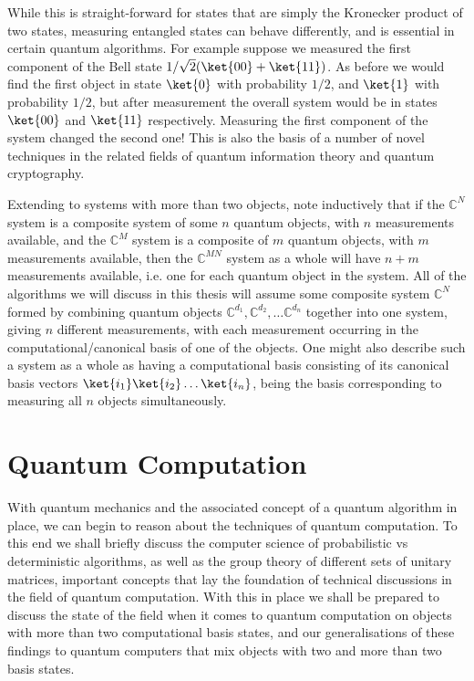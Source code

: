 While this is straight-forward for states that are simply the Kronecker product of two states, measuring entangled states can behave differently, and is essential in certain quantum algorithms. For example suppose we measured the first component of the Bell state $1/\sqrt{2}(\ket{00}+\ket{11})$. As before we would find the first object in state $\ket{0}$ with probability $1/2$, and $\ket{1}$ with probability $1/2$, but after measurement the overall system would be in states $\ket{00}$ and $\ket{11}$ respectively. Measuring the first component of the system changed the second one! This is also the basis of a number of novel techniques in the related fields of quantum information theory and quantum cryptography.

Extending to systems with more than two objects, note inductively that if the $\mathbb{C}^N$ system is a composite system of some $n$ quantum objects, with $n$ measurements available, and the $\mathbb{C}^M$ system is a composite of $m$ quantum objects, with $m$ measurements available, then the $\mathbb{C}^{MN}$ system as a whole will have $n+m$ measurements available, i.e. one for each quantum object in the system. All of the algorithms we will discuss in this thesis will assume some composite system $\mathbb{C}^N$ formed by combining quantum objects $\mathbb{C}^{d_1}, \mathbb{C}^{d_2}, \dots \mathbb{C}^{d_n}$ together into one system, giving $n$ different measurements, with each measurement occurring in the computational/canonical basis of one of the objects. One might also describe such a system as a whole as having a computational basis consisting of its canonical basis vectors $\ket{i_1}\ket{i_2}\dots\ket{i_n}$, being the basis corresponding to measuring all $n$ objects simultaneously.


\section{Quantum Computation}

With quantum mechanics and the associated concept of a quantum algorithm in place, we can begin to reason about the techniques of quantum computation. To this end we shall briefly discuss the computer science of probabilistic vs deterministic algorithms, as well as the group theory of different sets of unitary matrices, important concepts that lay the foundation of technical discussions in the field of quantum computation. With this in place we shall be prepared to discuss the state of the field when it comes to quantum computation on objects with more than two computational basis states, and our generalisations of these findings to quantum computers that mix objects with two and more than two basis states.


